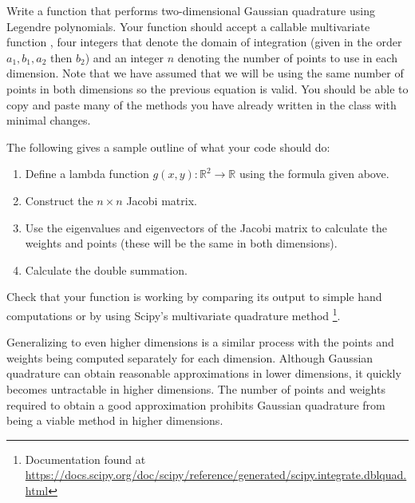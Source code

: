 \begin{problem}
Write a function that performs two-dimensional Gaussian quadrature using Legendre polynomials.
Your function should accept a callable multivariate function , four integers that denote the domain of integration (given in the order $a_1, b_1, a_2$ then $b_2$) and an integer $n$ denoting the number 
of points to use in each dimension.
Note that we have assumed that we will be using the same number of points in both dimensions so the previous equation is valid.
You should be able to copy and paste many of the methods you have already written in the  class with minimal changes.

The following gives a sample outline of what your code should do:
\begin{enumerate}
\item Define a lambda function $g(x,y):\mathbb{R}^2 \rightarrow \mathbb{R}$ using the formula given above.
\item Construct the $n\times n$ Jacobi matrix.
\item Use the eigenvalues and eigenvectors of the Jacobi matrix to calculate the weights and points (these will be the same in both dimensions).
\item Calculate the double summation.
\end{enumerate}

Check that your function is working by comparing its output to simple hand computations or by using Scipy's multivariate quadrature method 
\footnote{Documentation found at \url{https://docs.scipy.org/doc/scipy/reference/generated/scipy.integrate.dblquad.html}}.
\end{problem}

Generalizing to even higher dimensions is a similar process with the points and weights being computed separately for each dimension.
Although Gaussian quadrature can obtain reasonable approximations in lower dimensions, it quickly becomes untractable in higher dimensions.
The number of points and weights required to obtain a good approximation prohibits Gaussian quadrature from being a viable method in higher dimensions.

